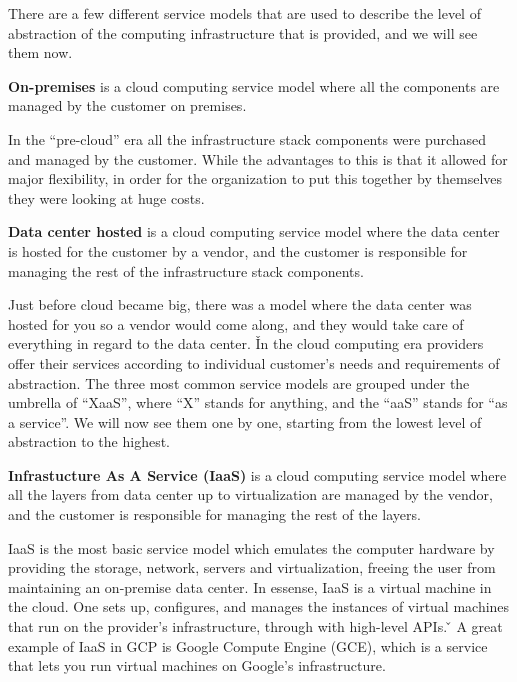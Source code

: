 There are a few different service models that are used to describe the level of abstraction of the computing
infrastructure that is provided, and we will see them now.

\bd[On-Premises]
\textbf{On-premises} is a cloud computing service model where all the components are managed by the customer on
premises.
\ed

In the ``pre-cloud'' era all the infrastructure stack components were purchased and managed by the customer. While
the advantages to this is that it allowed for major flexibility, in order for the organization to put this together
by themselves they were looking at huge costs.

\textbf{Data center hosted} is a cloud computing service model where the data center is hosted for the customer by a
vendor, and the customer is responsible for managing the rest of the infrastructure stack components.
\ed

Just before cloud became big, there was a model where the data center was hosted for you so a vendor would come along,
and they would take care of everything in regard to the data center. \v

In the cloud computing era providers offer their services according to individual customer's needs and requirements
of abstraction. The three most common service models are grouped under the umbrella of ``XaaS'', where ``X'' stands
for anything, and the ``aaS'' stands for ``as a service''. We will now see them one by one, starting from the lowest
level of abstraction to the highest.

\label{def:iaas}
\textbf{Infrastucture As A Service (IaaS)} is a cloud computing service model where all the layers from data center
up to virtualization are managed by the vendor, and the customer is responsible for managing the rest of the layers.
\ed

IaaS is the most basic service model which emulates the computer hardware by providing the storage, network, servers and
virtualization, freeing the user from maintaining an on-premise data center. In essense, IaaS is a virtual machine in
the cloud. One sets up, configures, and manages the instances of virtual machines that run on the provider's
infrastructure, through with high-level APIs. \v

\be
A great example of IaaS in GCP is Google Compute Engine (GCE), which is a service that lets you run virtual machines on
Google's infrastructure.
\ee

